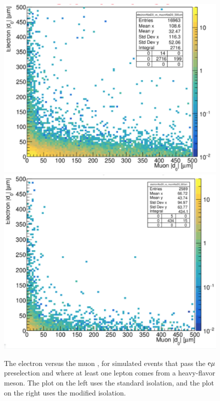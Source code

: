 \begin{figure}[hbtp]
\centering
\includegraphics[scale=0.4]{figures/selection/StandardIso_ElectronD0vsMuonD0_2018emuTTbar.png}
\includegraphics[scale=0.4]{figures/selection/CustomIso_ElectronD0vsMuonD0_2018emuTTbar.png}
\caption{The electron \ad versus the muon \ad, for \ttbar simulated events that pass the $\mathrm{e}{\mu}$ preselection and where at least one lepton comes from a heavy-flavor meson. The plot on the left uses the standard isolation, and the plot on the right uses the modified isolation.}
\label{iso_performance_comparison}
\end{figure}

